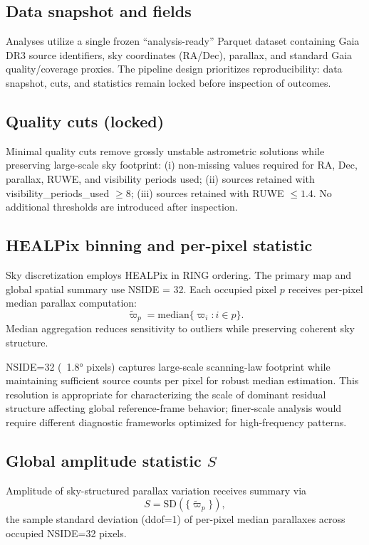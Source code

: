 \documentclass{aa}
\begin{document}
\subsection{Data snapshot and fields}
Analyses utilize a single frozen ``analysis-ready'' Parquet dataset containing Gaia DR3 source identifiers, sky coordinates (RA/Dec), parallax, and standard Gaia quality/coverage proxies. The pipeline design prioritizes reproducibility: data snapshot, cuts, and statistics remain locked before inspection of outcomes.

\subsection{Quality cuts (locked)}
Minimal quality cuts remove grossly unstable astrometric solutions while preserving large-scale sky footprint: (i) non-missing values required for RA, Dec, parallax, RUWE, and visibility periods used; (ii) sources retained with visibility\_periods\_used $\ge 8$; (iii) sources retained with RUWE $\le 1.4$. No additional thresholds are introduced after inspection.

\subsection{HEALPix binning and per-pixel statistic}
Sky discretization employs HEALPix in RING ordering. The primary map and global spatial summary use NSIDE = 32. Each occupied pixel $p$ receives per-pixel median parallax computation:
\[
\tilde{\varpi}_{p} = \mathrm{median}\{\varpi_i : i \in p\}.
\]
Median aggregation reduces sensitivity to outliers while preserving coherent sky structure.

NSIDE=32 (~1.8° pixels) captures large-scale scanning-law footprint while maintaining sufficient source counts per pixel for robust median estimation. This resolution is appropriate for characterizing the scale of dominant residual structure affecting global reference-frame behavior; finer-scale analysis would require different diagnostic frameworks optimized for high-frequency patterns.

\subsection{\texorpdfstring{Global amplitude statistic $S$}{Global amplitude statistic S} }
Amplitude of sky-structured parallax variation receives summary via
\[
S = \mathrm{SD}\left(\{\tilde{\varpi}_{p}\}\right),
\]
the sample standard deviation (ddof=1) of per-pixel median parallaxes across occupied NSIDE=32 pixels.
\end{document}
